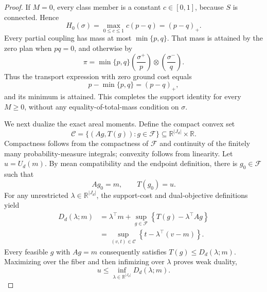 \documentclass{article}
\begin{document}
\begin{proof}
If \(M=0\), every class member is a constant \(c\in[0,1]\), because \(S\) is connected.  Hence
\[
 H_0(\sigma)=\max_{0\leq c\leq1}c(p-q)=(p-q)_+.
\]
Every partial coupling has mass at most \(\min\{p,q\}\).  That mass is attained by the zero plan when \(pq=0\), and otherwise by
\[
 \pi=\min\{p,q\}\left(\frac{\sigma^+}{p}\right)
                    \otimes\left(\frac{\sigma^-}{q}\right).
\]
Thus the transport expression with zero ground cost equals
\[
 p-\min\{p,q\}=(p-q)_+,
\]
and its minimum is attained.  This completes the support identity for every \(M\geq0\), without any equality-of-total-mass condition on \(\sigma\).

We next dualize the exact areal moments.  Define the compact convex set
\[
 \mathcal C=\{(Ag,T(g)):g\in\mathcal F\}
 \subseteq \mathbb R^{\lvert J_d\rvert}\times\mathbb R.
\]
Compactness follows from the compactness of \(\mathcal F\) and continuity of the finitely many probability-measure integrals; convexity follows from linearity.  Let \(u=U_d(m)\).  By mean compatibility and the endpoint definition, there is \(g_0\in\mathcal F\) such that
\[
 Ag_0=m,
 \qquad
 T(g_0)=u.
\]
For any unrestricted \(\lambda\in\mathbb R^{\lvert J_d\rvert}\), the support-cost and dual-objective definitions yield
\[
\begin{aligned}
 D_d(\lambda;m)
 &=\lambda^\top m+\sup_{g\in\mathcal F}
       \left\{T(g)-\lambda^\top Ag\right\}\\
 &=\sup_{(v,t)\in\mathcal C}
       \left\{t-\lambda^\top(v-m)\right\}.
\end{aligned}
\]
Every feasible \(g\) with \(Ag=m\) consequently satisfies \(T(g)\leq D_d(\lambda;m)\).  Maximizing over the fiber and then infimizing over \(\lambda\) proves weak duality,
\[
 u\leq\inf_{\lambda\in\mathbb R^{\lvert J_d\rvert}}D_d(\lambda;m).
\]


\end{proof}
\end{document}
